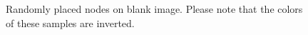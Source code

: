 \begin{figure}
\begin{subfigure}[b]{0.19\textwidth}
    \end{subfigure}
    \begin{subfigure}[b]{0.19\textwidth}
    \end{subfigure}
    \begin{subfigure}[b]{0.19\textwidth}
    \end{subfigure}
    \caption[Randomly placed nodes on blank image]{Randomly placed nodes on blank image. Please note that the colors of these samples are inverted. }
    \label{fig:constraint_data_step1}
\end{figure}

